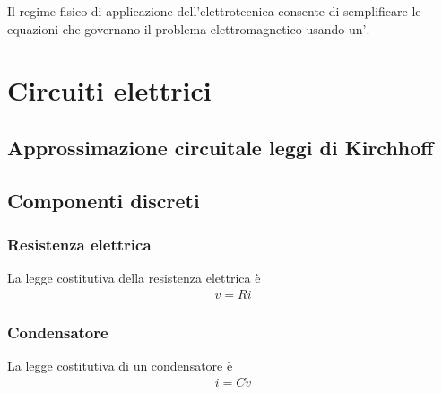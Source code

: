 \documentclass[letterpaper,10pt,italian]{jupyterBook}
\begin{document}
\sphinxAtStartPar
Il regime fisico di applicazione dell’elettrotecnica consente di semplificare le equazioni che governano il problema elettromagnetico usando un\(\text{'}\).

\sphinxstepscope


\section{Circuiti elettrici}
\label{\detokenize{ch/electromagnetism/circuits-electric:circuiti-elettrici}}\label{\detokenize{ch/electromagnetism/circuits-electric:physics-hs-electromagnetism-circuits-electric}}\label{\detokenize{ch/electromagnetism/circuits-electric::doc}}

\subsection{Approssimazione circuitale \sphinxhyphen{} leggi di Kirchhoff}
\label{\detokenize{ch/electromagnetism/circuits-electric:approssimazione-circuitale-leggi-di-kirchhoff}}

\subsection{Componenti discreti}
\label{\detokenize{ch/electromagnetism/circuits-electric:componenti-discreti}}

\subsubsection{Resistenza elettrica}
\label{\detokenize{ch/electromagnetism/circuits-electric:resistenza-elettrica}}
\sphinxAtStartPar
La legge costitutiva della resistenza elettrica è
\begin{equation*}
\begin{split}v = R i\end{split}
\end{equation*}

\subsubsection{Condensatore}
\label{\detokenize{ch/electromagnetism/circuits-electric:condensatore}}
\sphinxAtStartPar
La legge costitutiva di un condensatore è
\begin{equation*}
\begin{split}i = C \dot{v}\end{split}
\end{equation*}
\end{document}
